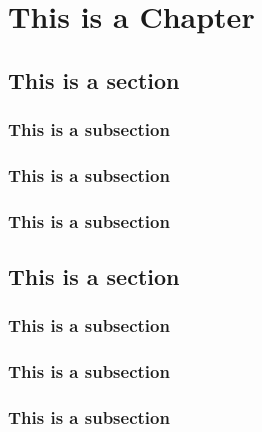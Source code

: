 \chapter{This is a Chapter}

\section{This is a section}

\subsection{This is a subsection}
\subsection{This is a subsection}
\subsection{This is a subsection}

\section{This is a section}

\subsection{This is a subsection}
\subsection{This is a subsection}
\subsection{This is a subsection}
